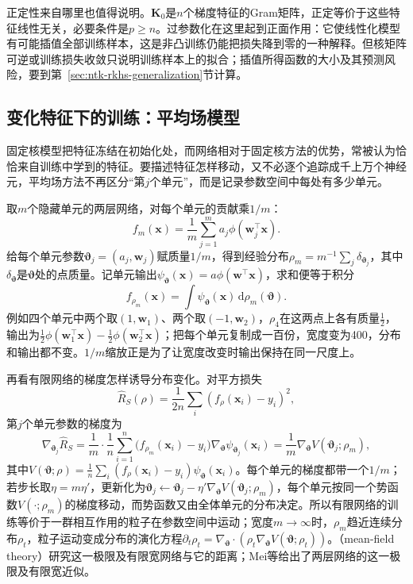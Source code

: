 正定性来自哪里也值得说明。$\bm K_0$是$n$个梯度特征的Gram矩阵，正定等价于这些特征线性无关，必要条件是$p\geq n$。过参数化在这里起到正面作用：它使线性化模型有可能插值全部训练样本，这是非凸训练仍能把损失降到零的一种解释。但核矩阵可逆或训练损失收敛只说明训练样本上的拟合；插值所得函数的大小及其预测风险，要到第~\ref{sec:ntk-rkhs-generalization}节计算。

\subsection{变化特征下的训练：平均场模型}
\label{sec:mean-field}

固定核模型把特征冻结在初始化处，而网络相对于固定核方法的优势，常被认为恰恰来自训练中学到的特征。要描述特征怎样移动，又不必逐个追踪成千上万个神经元，平均场方法不再区分“第$j$个单元”，而是记录参数空间中每处有多少单元。

取$m$个隐藏单元的两层网络，对每个单元的贡献乘$1/m$：
\[
 f_m(\bm x)=\frac1m\sum_{j=1}^m a_j\phi(\bm w_j^\top\bm x).
\]
给每个单元参数$\bm\vartheta_j=(a_j,\bm w_j)$赋质量$1/m$，得到经验分布$\rho_m=m^{-1}\sum_j\delta_{\bm\vartheta_j}$，其中$\delta_{\bm\vartheta}$是$\bm\vartheta$处的点质量。记单元输出$\psi_{\bm\vartheta}(\bm x)=a\phi(\bm w^\top\bm x)$，求和便等于积分
\begin{equation}
 f_{\rho_m}(\bm x)=\int \psi_{\bm\vartheta}(\bm x)\,\mathrm d\rho_m(\bm\vartheta).
 \label{eq:mean-field-network}
\end{equation}
例如四个单元中两个取$(1,\bm w_1)$、两个取$(-1,\bm w_2)$，$\rho_4$在这两点上各有质量$\tfrac12$，输出为$\tfrac12\phi(\bm w_1^\top\bm x)-\tfrac12\phi(\bm w_2^\top\bm x)$；把每个单元复制成一百份，宽度变为400，分布和输出都不变。$1/m$缩放正是为了让宽度改变时输出保持在同一尺度上。

再看有限网络的梯度怎样诱导分布变化。对平方损失
\[
 \hat R_S(\rho)=\frac1{2n}\sum_i(f_\rho(\bm x_i)-y_i)^2,
\]
第$j$个单元参数的梯度为
\[
 \nabla_{\bm\vartheta_j}\hat R_S
 =\frac1m\cdot\frac1n\sum_{i=1}^n\bigl(f_{\rho_m}(\bm x_i)-y_i\bigr)\nabla_{\bm\vartheta}\psi_{\bm\vartheta_j}(\bm x_i)
 =\frac1m\nabla_{\bm\vartheta}V(\bm\vartheta_j;\rho_m),
\]
其中$V(\bm\vartheta;\rho)=\frac1n\sum_i(f_\rho(\bm x_i)-y_i)\psi_{\bm\vartheta}(\bm x_i)$。每个单元的梯度都带一个$1/m$；若步长取$\eta=m\eta'$，更新化为$\bm\vartheta_j\leftarrow\bm\vartheta_j-\eta'\nabla_{\bm\vartheta}V(\bm\vartheta_j;\rho_m)$，每个单元按同一个势函数$V(\cdot;\rho_m)$的梯度移动，而势函数又由全体单元的分布决定。所以有限网络的训练等价于一群相互作用的粒子在参数空间中运动；宽度$m\to\infty$时，$\rho_m$趋近连续分布$\rho_t$，粒子运动变成分布的演化方程$\partial_t\rho_t=\nabla_{\bm\vartheta}\cdot(\rho_t\nabla_{\bm\vartheta}V(\bm\vartheta;\rho_t))$。（mean-field theory）研究这一极限及有限宽网络与它的距离；Mei等给出了两层网络的这一极限及有限宽近似。


